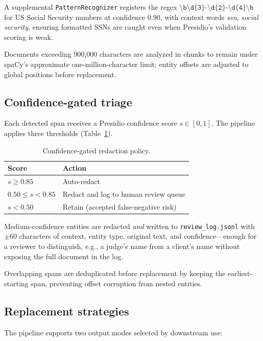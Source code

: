 \documentclass[11pt,a4paper]{article}
\begin{document}
A supplemental \texttt{PatternRecognizer} registers the regex $\texttt{\textbackslash b\textbackslash d\{3\}-\textbackslash d\{2\}-\textbackslash d\{4\}\textbackslash b}$ for US Social Security numbers at confidence 0.90, with context words \emph{ssn}, \emph{social security}, ensuring formatted SSNs are caught even when Presidio's validation scoring is weak.

Documents exceeding 900{,}000 characters are analyzed in chunks to remain under spaCy's approximate one-million-character limit; entity offsets are adjusted to global positions before replacement.

\subsection{Confidence-gated triage}

Each detected span receives a Presidio confidence score $s \in [0,1]$. The pipeline applies three thresholds (Table~\ref{tab:confidence}).

\begin{table}[ht]
\centering
\caption{Confidence-gated redaction policy.}
\label{tab:confidence}
\begin{tabular}{@{}ll@{}}
\toprule
\textbf{Score} & \textbf{Action} \\
\midrule
$s \geq 0.85$ & Auto-redact \\
$0.50 \leq s < 0.85$ & Redact and log to human review queue \\
$s < 0.50$ & Retain (accepted false-negative risk) \\
\bottomrule
\end{tabular}
\end{table}

Medium-confidence entities are redacted \emph{and} written to \texttt{review\_log.jsonl} with $\pm 60$ characters of context, entity type, original text, and confidence---enough for a reviewer to distinguish, e.g., a judge's name from a client's name without exposing the full document in the log.

Overlapping spans are deduplicated before replacement by keeping the earliest-starting span, preventing offset corruption from nested entities.

\subsection{Replacement strategies}

The pipeline supports two output modes selected by downstream use:
\end{document}
